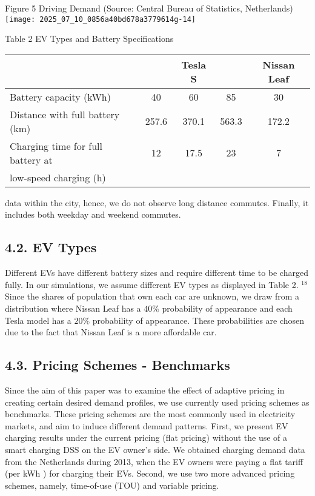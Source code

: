 \documentclass[10pt]{article}
\begin{document}
Figure 5 Driving Demand (Source: Central Bureau of Statistics, Netherlands)\\
\texttt{[image: 2025\_07\_10\_0856a40bd678a3779614g-14]}

Table 2 EV Types and Battery Specifications

\begin{center}
\begin{tabular}{lcccc}
\hline
 &  & Tesla S &  & Nissan Leaf \\
\hline
Battery capacity (kWh) & 40 & 60 & 85 & 30 \\
Distance with full battery (km) & 257.6 & 370.1 & 563.3 & 172.2 \\
Charging time for full battery at & 12 & 17.5 & 23 & 7 \\
low-speed charging (h) &  &  &  &  \\
\hline
\end{tabular}
\end{center}

data within the city, hence, we do not observe long distance commutes. Finally, it includes both weekday and weekend commutes.

\subsection*{4.2. EV Types}
Different EVs have different battery sizes and require different time to be charged fully. In our simulations, we assume different EV types as displayed in Table 2. ${ }^{18}$ Since the shares of population that own each car are unknown, we draw from a distribution where Nissan Leaf has a $40 \%$ probability of appearance and each Tesla model has a $20 \%$ probability of appearance. These probabilities are chosen due to the fact that Nissan Leaf is a more affordable car.

\subsection*{4.3. Pricing Schemes - Benchmarks}
Since the aim of this paper was to examine the effect of adaptive pricing in creating certain desired demand profiles, we use currently used pricing schemes as benchmarks. These pricing schemes are the most commonly used in electricity markets, and aim to induce different demand patterns. First, we present EV charging results under the current pricing (flat pricing) without the use of a smart charging DSS on the EV owner's side. We obtained charging demand data from the Netherlands during 2013, when the EV owners were paying a flat tariff (per kWh ) for charging their EVs. Second, we use two more advanced pricing schemes, namely, time-of-use (TOU) and variable pricing.
\end{document}
